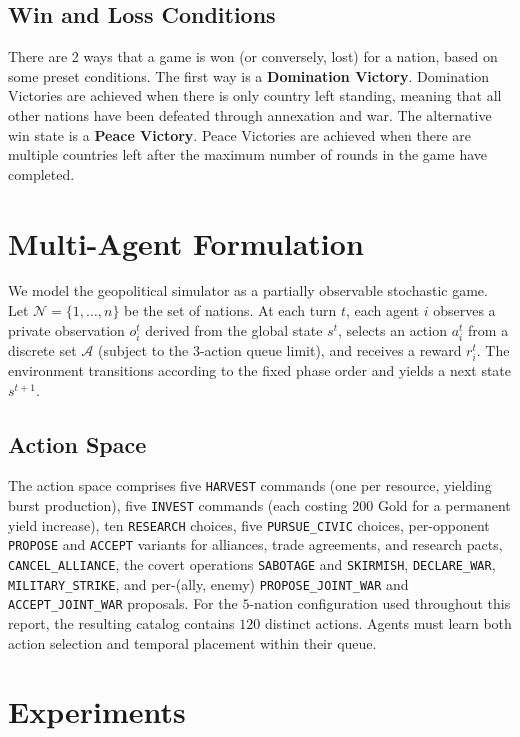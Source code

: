 \documentclass[11pt, a4paper, onecolumn]{article} %
\begin{document}
\subsection{Win and Loss Conditions}

There are 2 ways that a game is won (or conversely, lost) for a nation, based on some preset conditions. The first way is a \textbf{Domination Victory}. Domination Victories are achieved when there is only country left standing, meaning that all other nations have been defeated through annexation and war. The alternative win state is a \textbf{Peace Victory}. Peace Victories are achieved when there are multiple countries left after the maximum number of rounds in the game have completed.

\section{Multi-Agent Formulation}

We model the geopolitical simulator as a partially observable stochastic game. Let $\mathcal{N} = \{1,\dots,n\}$ be the set of nations. At each turn $t$, each agent $i$ observes a private observation $o_i^t$ derived from the global state $s^t$, selects an action $a_i^t$ from a discrete set $\mathcal{A}$ (subject to the 3-action queue limit), and receives a reward $r_i^t$. The environment transitions according to the fixed phase order and yields a next state $s^{t+1}$.

\subsection{Action Space}

The action space comprises five \texttt{HARVEST} commands (one per resource, yielding burst production), five \texttt{INVEST} commands (each costing 200 Gold for a permanent yield increase), ten \texttt{RESEARCH} choices, five \texttt{PURSUE\_CIVIC} choices, per-opponent \texttt{PROPOSE} and \texttt{ACCEPT} variants for alliances, trade agreements, and research pacts, \texttt{CANCEL\_ALLIANCE}, the covert operations \texttt{SABOTAGE} and \texttt{SKIRMISH}, \texttt{DECLARE\_WAR}, \texttt{MILITARY\_STRIKE}, and per-(ally, enemy) \texttt{PROPOSE\_JOINT\_WAR} and \texttt{ACCEPT\_JOINT\_WAR} proposals. For the $5$-nation configuration used throughout this report, the resulting catalog contains $120$ distinct actions. Agents must learn both action selection and temporal placement within their queue.

\section{Experiments}
\label{sec:experiments}
\end{document}
